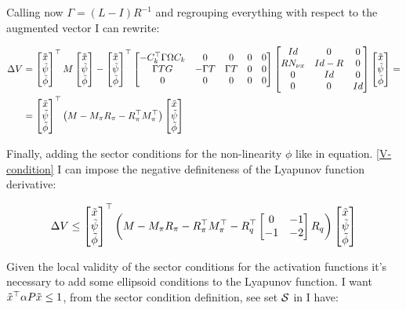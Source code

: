\documentclass{article}
\begin{document}
Calling now $ \Gamma = (L - I) R^{-1} $ and regrouping everything with respect to the augmented vector I can rewrite:

\begin{align*}
  \Delta V &= \left[\begin{matrix}
    \tilde{x}\\
    \tilde{\psi}\\
    \tilde{\phi}
  \end{matrix}\right]^\top M \left[\begin{matrix}
    \tilde{x}\\
    \tilde{\psi}\\
    \tilde{\phi}
  \end{matrix}\right] - \left[\begin{matrix}
    \tilde{x}\\
    \tilde{\psi}\\
    \tilde{\phi}
  \end{matrix}\right]^\top \left[\begin{matrix}
    -C_{k}^\top \Gamma \Omega C_{k} & 0 & 0 & 0 & 0 \\
    \Gamma T G & - \Gamma T & \Gamma T & 0 & 0 \\
    0 & 0 & 0 & 0 & 0
  \end{matrix}\right] \left[\begin{matrix}
    Id & 0 & 0 \\
    R N_{\nu x} & Id - R & 0 \\
    0 & Id & 0\\
    0 & 0 & Id
  \end{matrix}\right] \left[\begin{matrix}
    \tilde{x}\\
    \tilde{\psi}\\
    \tilde{\phi}
  \end{matrix}\right] = \\
  &= \left[\begin{matrix}
    \tilde{x}\\
    \tilde{\psi}\\
    \tilde{\phi}
  \end{matrix}\right]^\top \left( M - M_{\pi} R_{\pi} - R_{\pi}^\top M_{\pi}^\top \right) \left[\begin{matrix}
    \tilde{x}\\
    \tilde{\psi}\\
    \tilde{\phi}
  \end{matrix}\right]
\end{align*}

Finally, adding the sector conditions for the non-linearity $\phi$ like in equation. \ref{V-condition} I can impose the negative definiteness of the Lyapunov function derivative:

\begin{equation}
  \Delta V \leq \left[\begin{matrix}
    \tilde{x}\\
    \tilde{\psi}\\
    \tilde{\phi}
  \end{matrix}\right]^\top \left( 
    M - M_{\pi} R_{\pi} - R_{\pi}^\top M_{\pi}^\top - R_{q}^\top \left[\begin{matrix}
      0 & -1 \\
      -1 & -2
    \end{matrix}\right] R_{q}
   \right) \left[\begin{matrix}
    \tilde{x}\\
    \tilde{\psi}\\
    \tilde{\phi}
   \end{matrix}\right]
\end{equation}

Given the local validity of the sector conditions for the activation functions it's necessary to add some ellipsoid conditions to the Lyapunov function. I want $\tilde{x}^\top \alpha P \tilde{x} \leq 1$, from the sector condition definition, see set ${\mathcal{S}}$ in \cite{css-extended} I have:
\end{document}
